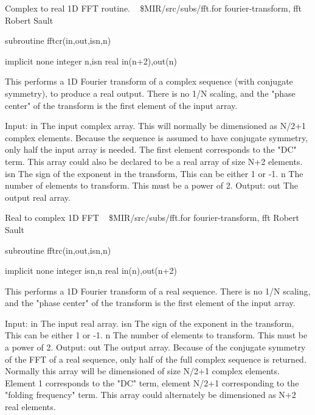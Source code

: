 %
\noindent Complex to real 1D FFT routine.
\newline \ 
\newline {} \$MIR/src/subs/fft.for
\newline {} fourier-transform, fft
\newline {} Robert Sault
\par{\tenpoint
{\eightpoint\begintt
        subroutine fftcr(in,out,isn,n)

        implicit none
        integer n,isn
        real in(n+2),out(n)

  This performs a 1D Fourier transform of a complex sequence (with
  conjugate symmetry), to produce a real output. There is no
  1/N scaling, and the "phase center" of the transform is the first
  element of the input array.

  Input:
    in         The input complex array. This will normally be dimensioned
               as N/2+1 complex elements. Because the sequence is assumed
               to have conjugate symmetry, only half the input array is
               needed. The first element corresponds to the "DC" term.
               This array could also be declared to be a real array of
               size N+2 elements.
    isn        The sign of the exponent in the transform, This can be
               either 1 or -1.
    n          The number of elements to transform. This must be a power
               of 2.
  Output:
    out        The output real array.
\endtt}
\par}
%
\noindent Real to complex 1D FFT
\newline \ 
\newline {} \$MIR/src/subs/fft.for
\newline {} fourier-transform, fft
\newline \abox{Responsible:} Robert Sault
\par{\tenpoint
{\eightpoint\begintt
        subroutine fftrc(in,out,isn,n)

        implicit none
        integer isn,n
        real in(n),out(n+2)

  This performs a 1D Fourier transform of a real sequence. There is no
  1/N scaling, and the "phase center" of the transform is the first
  element of the input array.

  Input:
    in         The input real array.
    isn        The sign of the exponent in the transform, This can be
               either 1 or -1.
    n          The number of elements to transform. This must be a power
               of 2.
  Output:
    out        The output array. Because of the conjugate symmetry of the
               FFT of a real sequence, only half of the full complex sequence
               is returned. Normally this array will be dimensioned of size
               N/2+1 complex elements. Element 1 corresponds to the "DC" term,
               element N/2+1 corresponding to the "folding frequency" term.
               This array could alternately be dimensioned as N+2 real
               elements.
\endtt}
\par}

